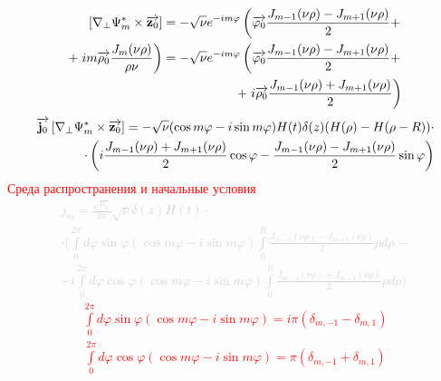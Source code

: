 %
\textcolor{lightgray} { \begin{equation*} \begin{aligned}
\left[  \nabla_\perp \Psi_m^*  \times  \overrightarrow{\mathbf z_0}  \right] = 
- \sqrt{\nu} e^{-im\varphi} \left( 
\overrightarrow{\mathbf \varphi_0} \frac{J_{m-1} (\nu \rho) - J_{m+1} (\nu \rho)}{2} + 
\right. \\ + \left. i m \overrightarrow{\mathbf \rho_0} \frac{J_m (\nu \rho)}
{\rho \nu} \right) = - \sqrt{\nu} e^{-im\varphi} \left( 
\overrightarrow{\mathbf \varphi_0} \frac{J_{m-1} (\nu \rho) - J_{m+1} (\nu \rho)}{2} + 
\right. \\ + \left. i \overrightarrow{\mathbf \rho_0} \frac{J_{m-1} (\nu \rho) + 
J_{m+1} (\nu \rho)}{2} \right)
\end{aligned} \end{equation*} }
%
\textcolor{lightgray} { \begin{equation*} \begin{aligned}
\overrightarrow{\mathbf j_0} \left[  \nabla_\perp \Psi_m^*  \times  \overrightarrow{\mathbf z_0}  \right] = 
- \sqrt{\nu} ( \cos m \varphi - i \sin m \varphi ) 
H(t) \delta(z) ( H(\rho) - H(\rho - R) ) \cdot \\ \cdot \left( 
i \frac{J_{m-1} (\nu \rho) + J_{m+1} (\nu \rho)}{2} \cos \varphi
- \frac{J_{m-1} (\nu \rho) - J_{m+1} (\nu \rho)}{2} \sin \varphi
\right)
\end{aligned} \end{equation*} }
%
\textcolor{red}{ Среда распространения и начальные условия }
%
\textcolor{lightgray} { \begin{equation*} \begin{aligned}
j_m = \frac{\sqrt{\mu_0}}{2\pi} \sqrt{\nu} \delta(z) H(t) \cdot \\
\cdot \Big( \int \limits_{0}^{2\pi} d \varphi \sin \varphi 
( \cos m \varphi - i \sin m \varphi) \int \limits_{0}^{R} 
\frac{J_{m-1} (\nu \rho) - J_{m+1} (\nu \rho)}{2} \rho d \rho - \\
- i \int \limits_{0}^{2\pi} d \varphi \cos \varphi 
( \cos m \varphi - i \sin m \varphi) \int \limits_{0}^{R} 
\frac{J_{m-1} (\nu \rho) + J_{m+1} (\nu \rho)}{2} \rho d \rho \Big)
\end{aligned} \end{equation*} }
%
\textcolor{red} { \begin{equation*} \begin{aligned}
\int \limits_{0}^{2\pi} d \varphi \sin \varphi 
( \cos m \varphi - i \sin m \varphi) = i\pi ( \delta_{m,-1} - \delta_{m,1} )
\end{aligned} \end{equation*} }
%
\textcolor{red} { \begin{equation*} \begin{aligned}
\int \limits_{0}^{2\pi} d \varphi \cos \varphi 
( \cos m \varphi - i \sin m \varphi) = \pi ( \delta_{m,-1} + \delta_{m,1} )
\end{aligned} \end{equation*} }
